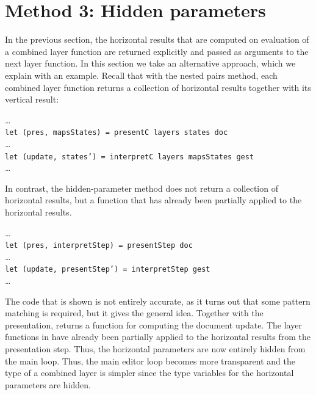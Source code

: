 \documentclass[preprint,natbib]{sigplanconf}
\begin{document}
%																
%																
%																
\section{Method 3: Hidden parameters} \label{sect:hidden}

 
In the previous section, the horizontal results that are computed on evaluation of a combined layer function are returned explicitly and passed as arguments to the next layer function. In this section we take an alternative approach, which we explain with an example.  Recall that with the nested pairs method, each combined layer function returns a collection of horizontal results together with its vertical result:

\dots\\
{\tt  let (pres, mapsStates) = presentC layers states doc }\\
\dots\\
{\tt let (update, states') = interpretC layers mapsStates gest}\\
\dots

In contrast, the hidden-parameter method does not return a collection of horizontal results, but a function that has already been partially applied to the horizontal results.

\dots\\
{\tt let (pres, interpretStep) = presentStep doc}\\
\dots\\
{\tt let (update, presentStep') = interpretStep gest}\\
\dots

The code that is shown is not entirely accurate, as it turns out that some pattern matching is required, but it gives the general idea. Together with the presentation,  returns a function  for computing the document update. The layer functions in  have already been partially applied to the horizontal results from the presentation step. Thus, the horizontal parameters are now entirely hidden from the main loop.  Thus, the main editor loop becomes more transparent and the type of a combined layer is simpler since the type variables for the horizontal parameters are hidden.


\end{document}
